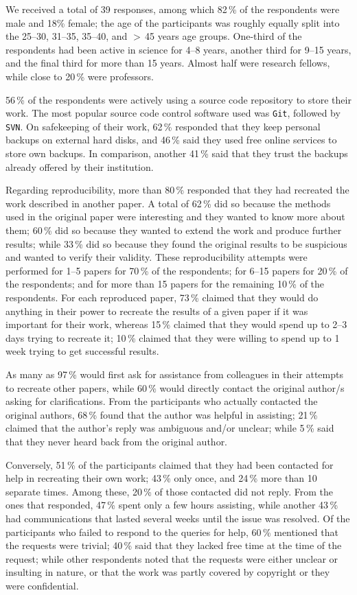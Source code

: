 \documentclass[twocolumn]{aa}
\begin{document}
We received a total of 39 responses, among which 82\,\% of the respondents were male and 18\% female; the age of the participants was roughly equally split into the 25--30, 31--35, 35--40, and $>$\,45 years age groups. One-third of the respondents had been active in science for 4--8 years, another third for 9--15 years, and the final third for more than 15 years. Almost half were research fellows, while close to 20\,\% were professors.

56\,\% of the respondents were actively using a source code repository to store their work. The most popular source code control software used was \texttt{Git}, followed by \texttt{SVN}. On safekeeping of their work, 62\,\% responded that they keep personal backups on external hard disks, and 46\,\% said they used free online services to store own backups. In comparison, another 41\,\% said that they trust the backups already offered by their institution.

Regarding reproducibility, more than 80\,\% responded that they had recreated the work described in another paper. A total of 62\,\% did so because the methods used in the original paper were interesting and they wanted to know more about them; 60\,\% did so because they wanted to extend the work and produce further results; while 33\,\% did so because they found the original results to be suspicious and wanted to verify their validity. These reproducibility attempts were performed for 1--5 papers for 70\,\% of the respondents; for 6--15 papers for 20\,\% of the respondents; and for more than 15 papers for the remaining 10\,\% of the respondents. For each reproduced paper, 73\,\% claimed that they would do anything in their power to recreate the results of a given paper if it was important for their work, whereas 15\,\% claimed that they would spend up to 2--3 days trying to recreate it; 10\,\% claimed that they were willing to spend up to 1 week trying to get successful results.

As many as 97\,\% would first ask for assistance from colleagues in their attempts to recreate other papers, while 60\,\% would directly contact the original author/s asking for clarifications. From the participants who actually contacted the original authors, 68\,\% found that the author was helpful in assisting; 21\,\% claimed that the author's reply was ambiguous and/or unclear; while 5\,\% said that they never heard back from the original author.

Conversely, 51\,\% of the participants claimed that they had been contacted for help in recreating their own work; 43\,\% only once, and 24\,\% more than 10 separate times. Among these, 20\,\% of those contacted did not reply. From the ones that responded, 47\,\% spent only a few hours assisting, while another 43\,\% had communications that lasted several weeks until the issue was resolved. Of the participants who failed to respond to the queries for help, 60\,\% mentioned that the requests were trivial; 40\,\% said that they lacked free time at the time of the request; while other respondents noted that the requests were either unclear or insulting in nature, or that the work was partly covered by copyright or they were confidential.
\end{document}
